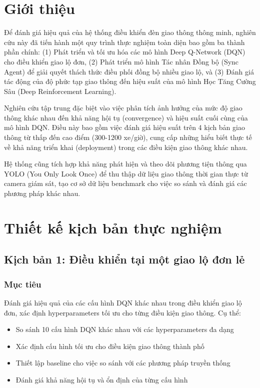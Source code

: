 \section{Giới thiệu}

Để đánh giá hiệu quả của hệ thống điều khiển đèn giao thông thông minh, nghiên cứu này đã tiến hành một quy trình thực nghiệm toàn diện bao gồm ba thành phần chính: (1) Phát triển và tối ưu hóa các mô hình Deep Q-Network (DQN) cho điều khiển giao lộ đơn, (2) Phát triển mô hình Tác nhân Đồng bộ (Sync Agent) để giải quyết thách thức điều phối đồng bộ nhiều giao lộ, và (3) Đánh giá tác động của độ phức tạp giao thông đến hiệu suất của mô hình Học Tăng Cường Sâu (Deep Reinforcement Learning).

Nghiên cứu tập trung đặc biệt vào việc phân tích ảnh hưởng của mức độ giao thông khác nhau đến khả năng hội tụ (convergence) và hiệu suất cuối cùng của mô hình DQN. Điều này bao gồm việc đánh giá hiệu suất trên 4 kịch bản giao thông từ thấp đến cao điểm (300-1200 xe/giờ), cung cấp những hiểu biết thực tế về khả năng triển khai (deployment) trong các điều kiện giao thông khác nhau.

Hệ thống cũng tích hợp khả năng phát hiện và theo dõi phương tiện thông qua YOLO (You Only Look Once) để thu thập dữ liệu giao thông thời gian thực từ camera giám sát, tạo cơ sở dữ liệu benchmark cho việc so sánh và đánh giá các phương pháp khác nhau.
\section{Thiết kế kịch bản thực nghiệm}

\subsection{Kịch bản 1: Điều khiển tại một giao lộ đơn lẻ}

\subsubsection{Mục tiêu}
Đánh giá hiệu quả của các cấu hình DQN khác nhau trong điều khiển giao lộ đơn, xác định hyperparameters tối ưu cho từng điều kiện giao thông. Cụ thể:
\begin{itemize}
    \item So sánh 10 cấu hình DQN khác nhau với các hyperparameters đa dạng
    \item Xác định cấu hình tối ưu cho điều kiện giao thông thành phố
    \item Thiết lập baseline cho việc so sánh với các phương pháp truyền thống
    \item Đánh giá khả năng hội tụ và ổn định của từng cấu hình
\end{itemize}

